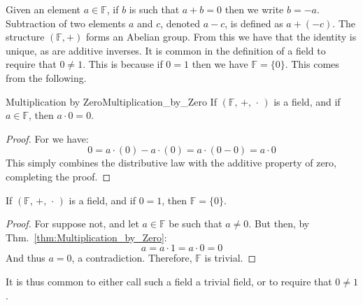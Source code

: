 \documentclass[crop=false,class=article]{standalone}                           %
\begin{document}
        Given an element $a\in\mathbb{F}$, if $b$ is such that
        $a+b=0$ then we write $b=\minus{a}$. Subtraction of two elements
        $a$ and $c$, denoted $a-c$, is defined as $a+(\minus{c})$. The
        structure $(\mathbb{F},+)$ forms an Abelian group. From this we have
        that the identity is unique, as are additive inverses.
        It is common in the definition of a field to require that
        $0\ne{1}$. This is because if $0=1$ then we have $\mathbb{F}=\{0\}$.
        This comes from the following.
        \begin{ltheorem}{Multiplication by Zero}{Multiplication_by_Zero}
            If $(\mathbb{F},\,+,\,\cdot\,)$ is a field, and if $a\in\mathbb{F}$,
            then $a\cdot{0}=0$.
        \end{ltheorem}
        \begin{proof}
            For we have:
            \begin{equation}
                0=a\cdot(0)-a\cdot(0)=a\cdot(0-0)=a\cdot{0}
            \end{equation}
            This simply combines the distributive law with the additive
            property of zero, completing the proof.
        \end{proof}
        \begin{theorem}
            If $(\mathbb{F},\,+,\,\cdot\,)$ is a field, and if $0=1$, then
            $\mathbb{F}=\{0\}$.
        \end{theorem}
        \begin{proof}
            For suppose not, and let $a\in\mathbb{F}$ be such that $a\ne{0}$.
            But then, by Thm.~\ref{thm:Multiplication_by_Zero}:
            \begin{equation}
                a=a\cdot{1}=a\cdot{0}=0
            \end{equation}
            And thus $a=0$, a contradiction. Therefore,
            $\mathbb{F}$ is trivial.
        \end{proof}
        It is thus common to either call such a field a trivial field, or
        to require that $0\ne{1}$.
\end{document}

